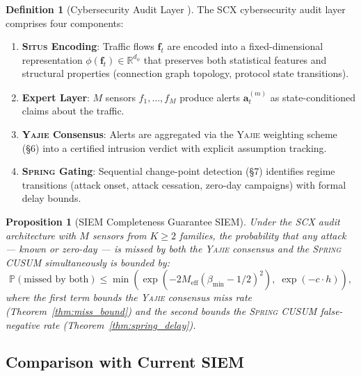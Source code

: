 \documentclass[11pt,a4paper]{article}
\newtheorem{proposition}[theorem]{Proposition}
\theoremstyle{definition}
\newtheorem{definition}[theorem]{Definition}
\theoremstyle{remark}
\newcommand{\Situs}{\textsc{Situs}}
\newcommand{\Yajie}{\textsc{Yajie}}
\newcommand{\Spring}{\textsc{Spring}}
\newcommand{\R}{\mathbb{R}}
\newcommand{\Pbb}{\mathbb{P}}
\newcommand{\alertvec}{\mathbf{a}}
\newcommand{\flowvec}{\mathbf{f}}
\begin{document}
\begin{definition}[Cybersecurity Audit Layer ]
\label{def:audit_layer}
The SCX cybersecurity audit layer comprises four components:
\begin{enumerate}[label=(\roman*)]
    \item \textbf{\Situs{} Encoding}: Traffic flows $\flowvec_t$ are encoded into a fixed-dimensional representation $\phi(\flowvec_t) \in \R^{d_\phi}$ that preserves both statistical features and structural properties (connection graph topology, protocol state transitions).
    \item \textbf{Expert Layer}: $M$ sensors $f_1, \ldots, f_M$ produce alerts $\alertvec_t^{(m)}$ as state-conditioned claims about the traffic.
    \item \textbf{\Yajie{} Consensus}: Alerts are aggregated via the \Yajie{} weighting scheme (\S6) into a certified intrusion verdict with explicit assumption tracking.
    \item \textbf{\Spring{} Gating}: Sequential change-point detection (\S7) identifies regime transitions (attack onset, attack cessation, zero-day campaigns) with formal delay bounds.
\end{enumerate}
\end{definition}

\begin{proposition}[SIEM Completeness Guarantee SIEM]
\label{prop:siem_completeness}
Under the SCX audit architecture with $M$ sensors from $K \geq 2$ families, the probability that \textit{any} attack — known or zero-day — is missed by both the \Yajie{} consensus and the \Spring{} CUSUM simultaneously is bounded by:
\begin{equation}
\Pbb(\text{missed by both}) \leq \min\!\left(\exp(-2 M_{\mathrm{eff}} (\beta_{\min} - 1/2)^2), \; \exp(-c \cdot h)\right),
\label{eq:siem_completeness}
\end{equation}
where the first term bounds the \Yajie{} consensus miss rate (Theorem~\ref{thm:miss_bound}) and the second bounds the \Spring{} CUSUM false-negative rate (Theorem~\ref{thm:spring_delay}).
\end{proposition}

\subsection{Comparison with Current SIEM}
\end{document}
